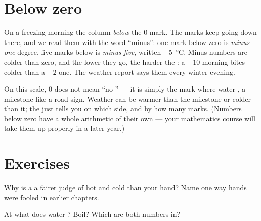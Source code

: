 \section{Below zero}

\begin{example}\label{ex:g3:temperature-thermometers:belowzero}
On a freezing morning the column  \emph{below} the $0$ mark.
The marks keep going down there, and we read them with the word
``minus'': one mark below zero is \emph{minus one} degree, five
marks below is \emph{minus five}, written \qty{-5}{\celsius}.
Minus numbers are colder than zero, and the lower they go, the
harder the : a $-10$ morning bites colder than a $-2$ one.
The weather report says them every winter evening.
\end{example}

\begin{remark}\label{rem:g3:temperature-thermometers:zero}
On this scale, $0$ does not mean ``no '' --- it is simply
the mark where water , a milestone like a road sign. Weather
can be warmer than the milestone or colder than it; the 
just tells you on which side, and by how many marks. (Numbers below
zero have a whole arithmetic of their own --- your mathematics
course will take them up properly in a later year.)
\end{remark}

\section{Exercises}

\begin{exercise}[$\star$]\label{exo:g3:temperature-thermometers:1}
Why is a  a fairer judge of hot and cold than your hand?
Name one way hands were fooled in earlier chapters.
\end{exercise}

\begin{exercise}[$\star$]\label{exo:g3:temperature-thermometers:2}
At what  does water ? Boil? Which  are both
numbers in?
\end{exercise}

